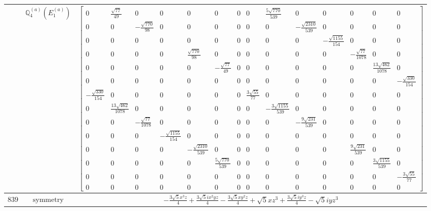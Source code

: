 \documentclass[fleqn,8pt,landscape]{jsarticle}
\begin{document}
\begin{longtable}{ccc}
$  $ & $ \mathbb{Q}_{4}^{(a)}(E_{1}^{(a)}) $ & $ \begin{bmatrix} 0 & \frac{\sqrt{77}}{49} & 0 & 0 & 0 & 0 & 0 & 0 & \frac{5 \sqrt{770}}{539} & 0 & 0 & 0 & 0 & 0 \\ 0 & 0 & - \frac{\sqrt{770}}{98} & 0 & 0 & 0 & 0 & 0 & 0 & - \frac{\sqrt{2310}}{539} & 0 & 0 & 0 & 0 \\ 0 & 0 & 0 & 0 & 0 & 0 & 0 & 0 & 0 & 0 & - \frac{\sqrt{1155}}{154} & 0 & 0 & 0 \\ 0 & 0 & 0 & 0 & \frac{\sqrt{770}}{98} & 0 & 0 & 0 & 0 & 0 & 0 & - \frac{\sqrt{77}}{1078} & 0 & 0 \\ 0 & 0 & 0 & 0 & 0 & - \frac{\sqrt{77}}{49} & 0 & 0 & 0 & 0 & 0 & 0 & \frac{13 \sqrt{462}}{1078} & 0 \\ 0 & 0 & 0 & 0 & 0 & 0 & 0 & 0 & 0 & 0 & 0 & 0 & 0 & - \frac{\sqrt{330}}{154} \\ - \frac{\sqrt{330}}{154} & 0 & 0 & 0 & 0 & 0 & 0 & \frac{3 \sqrt{55}}{77} & 0 & 0 & 0 & 0 & 0 & 0 \\ 0 & \frac{13 \sqrt{462}}{1078} & 0 & 0 & 0 & 0 & 0 & 0 & - \frac{3 \sqrt{1155}}{539} & 0 & 0 & 0 & 0 & 0 \\ 0 & 0 & - \frac{\sqrt{77}}{1078} & 0 & 0 & 0 & 0 & 0 & 0 & - \frac{9 \sqrt{231}}{539} & 0 & 0 & 0 & 0 \\ 0 & 0 & 0 & - \frac{\sqrt{1155}}{154} & 0 & 0 & 0 & 0 & 0 & 0 & 0 & 0 & 0 & 0 \\ 0 & 0 & 0 & 0 & - \frac{\sqrt{2310}}{539} & 0 & 0 & 0 & 0 & 0 & 0 & \frac{9 \sqrt{231}}{539} & 0 & 0 \\ 0 & 0 & 0 & 0 & 0 & \frac{5 \sqrt{770}}{539} & 0 & 0 & 0 & 0 & 0 & 0 & \frac{3 \sqrt{1155}}{539} & 0 \\ 0 & 0 & 0 & 0 & 0 & 0 & 0 & 0 & 0 & 0 & 0 & 0 & 0 & - \frac{3 \sqrt{55}}{77} \\ 0 & 0 & 0 & 0 & 0 & 0 & 0 & 0 & 0 & 0 & 0 & 0 & 0 & 0 \end{bmatrix} $ \\ \hline
$ 839 $ & $ \text{symmetry} $ & $ - \frac{3 \sqrt{5} x^{3} z}{4} + \frac{3 \sqrt{5} i x^{2} y z}{4} - \frac{3 \sqrt{5} x y^{2} z}{4} + \sqrt{5} x z^{3} + \frac{3 \sqrt{5} i y^{3} z}{4} - \sqrt{5} i y z^{3} $ \\

\end{longtable}
\end{document}
